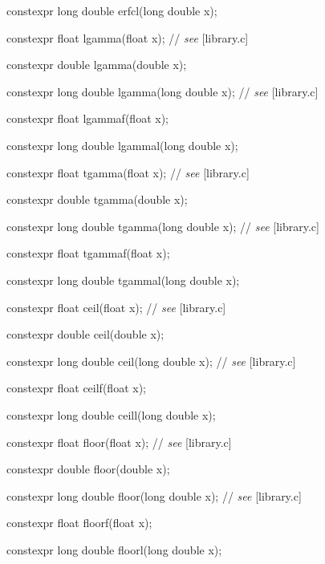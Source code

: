 \documentclass[prd,twocolumn,amsmath,amssymb,nofootinbib,eqsecnum]{revtex4-1}
\newcommand{\highlight}[1]{{\color{red} #1}}
\newcommand{\oldhighlight}[1]{{\color{green} #1}}
\newcommand{\stdcomment}[1]{{// {\it see} [#1]}}
\begin{document}
{\highlight{constexpr} long double erfcl(long double x);

\vspace{2ex}


\highlight{constexpr} float lgamma(float x); \stdcomment{library.c}

\highlight{constexpr} double lgamma(double x);

\highlight{constexpr} long double lgamma(long double x); \stdcomment{library.c}

\highlight{constexpr} float lgammaf(float x);

\highlight{constexpr} long double lgammal(long double x);

\vspace{2ex}

\highlight{constexpr} float tgamma(float x); \stdcomment{library.c}

\highlight{constexpr} double tgamma(double x);

\highlight{constexpr} long double tgamma(long double x); \stdcomment{library.c}

\highlight{constexpr} float tgammaf(float x);

\highlight{constexpr} long double tgammal(long double x);

\vspace{2ex}

\oldhighlight{constexpr} float ceil(float x); \stdcomment{library.c}

\oldhighlight{constexpr} double ceil(double x);

\oldhighlight{constexpr} long double ceil(long double x); \stdcomment{library.c}

\oldhighlight{constexpr} float ceilf(float x);

\oldhighlight{constexpr} long double ceill(long double x);

\vspace{2ex}


\oldhighlight{constexpr} float floor(float x); \stdcomment{library.c}

\oldhighlight{constexpr} double floor(double x);

\oldhighlight{constexpr} long double floor(long double x); \stdcomment{library.c}

\oldhighlight{constexpr} float floorf(float x);

\oldhighlight{constexpr} long double floorl(long double x);

}
\end{document}
